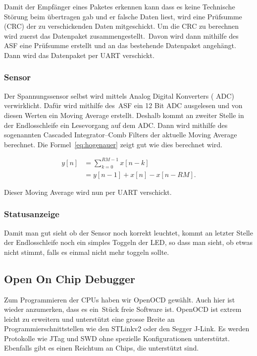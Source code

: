 Damit der  Empf\"anger eines  Paketes erkennen kann  dass es  keine Technische
St\"orung  beim  \"ubertragen  gab  und  er falsche  Daten  liest,  wird  eine
Pr\"ufsumme (CRC)  der zu  verschickenden Daten mitgeschickt.   Um die  CRC zu
berechnen  wird  zuerst  das  Datenpaket  zusammengestellt. Davon  wird  dann
mithilfe des  ASF eine Pr\"ufsumme  erstellt und an das  bestehende Datenpaket
angeh\"angt. Dann wird das Datenpaket per UART verschickt.

\subsubsection{Sensor}
\label{subs:Sensor}

Der  Spannungssensor selbst  wird  mittels Analog  Digital  Konverters (  ADC)
verwirklicht.  Daf\"ur  wird mithilfe des ASF  ein 12 Bit ADC  ausgelesen und
von  diesen Werten  ein Moving  Average  erstellt.  Deshalb  kommt an  zweiter
Stelle in der Endlosschleife ein Lesevorgang  auf dem ADC.  Dann wird mithilfe
des sogenannten Cascaded Integrator–Comb Filters der aktuelle Moving Average
berechnet. Die Formel~\ref{eq:hogenauer} zeigt gut wie dies berechnet wird.

\begin{equation}\label{eq:hogenauer}
    \begin{split}
        y[n] &= \sum_{k=0}^{RM-1} x[n-k] \\
             &= y[n-1] + x[n] - x[n-RM].
    \end{split}
\end{equation}

Dieser Moving Average wird nun per UART verschickt.

\subsubsection{Statusanzeige}
\label{subs:Statusanzeige}

Damit man  gut sieht  ob der  Sensor noch korrekt  leuchtet, kommt  an letzter
Stelle der Endlosschleife noch ein simples Toggeln der LED, so dass man sieht,
ob etwas nicht stimmt, falls es einmal nicht mehr toggeln sollte.

\subsection{Open On Chip Debugger}

Zum Programmieren der  CPUs haben wir OpenOCD gew\"ahlt. Auch  hier ist wieder
anzumerken, dass es ein St\"uck freie Software ist. OpenOCD ist extrem leicht
zu erweitern und unterst\"utzt eine grosse Breite an Programmierschnittstellen
wie den STLinkv2 oder den Segger J-Link. Es werden Protokolle wie JTag und SWD
ohne spezielle Konfigurationen unterst\"utzt. Ebenfalls gibt es einen Reichtum
an Chips, die unterst\"utzt sind.

